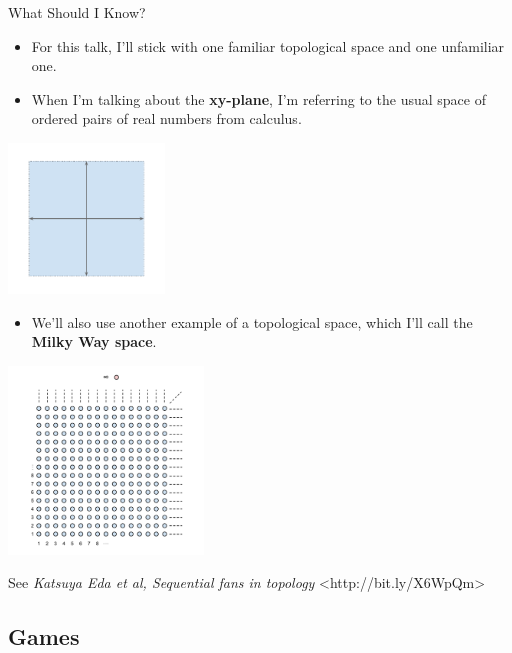 \documentclass{beamer}
\begin{document}
\begin{frame}{What Should I Know?}
  \begin{itemize}
  \item
    For this talk, I'll stick with one familiar topological space and one unfamiliar one.
  \pause
  \item
    When I'm talking about the \textbf{xy-plane}, I'm referring to the usual space of ordered pairs of real numbers from calculus.
  \end{itemize}
  \begin{center}
    \includegraphics[height=4cm]{images/r2}
  \end{center}
\end{frame}
\begin{frame}
  \begin{itemize}
  \item
    We'll also use another example of a topological space, which I'll call the \textbf{Milky Way space}.
  \end{itemize}
  \begin{center}
    \includegraphics[height=5cm]{images/milky_way}
  \end{center}
  {\tiny See \textit{Katsuya Eda et al, Sequential fans in topology} <http://bit.ly/X6WpQm>}
\end{frame}

\subsection{Games}
\end{document}
